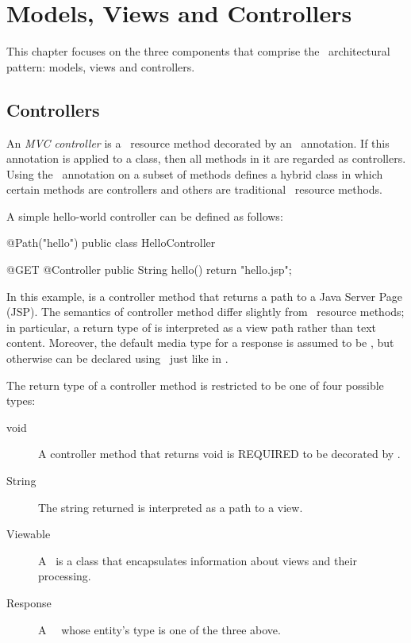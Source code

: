 \chapter{Models, Views and Controllers}
\label{mvc}

This chapter focuses on the three components that comprise the \mvc\ architectural pattern: models, views
and controllers. 

\section{Controllers}
\label{controllers}

An {\em MVC controller} is a \jaxrs\ resource method decorated by an \Controller\ annotation. If 
this annotation is applied to a class, then all methods in it are regarded as controllers. 
Using the \Controller\ annotation on a subset of methods defines a hybrid class in which 
certain methods are controllers and others are traditional \jaxrs\ resource methods.

A simple hello-world controller can be defined as follows:

\begin{listing}{1}
@Path("hello")
public class HelloController {

    @GET
    @Controller
    public String hello() {
        return "hello.jsp";
    }
}
\end{listing}

In this example,  is a controller method that returns a path to a Java Server Page (JSP).
The semantics of controller method differ slightly from \jaxrs\ resource methods; in particular, a
return type of  is interpreted as a view path rather than text content. Moreover,
the default media type for a response is assumed to be , but otherwise can
be declared using \Produces\ just like in \jaxrs.

The return type of a controller method is restricted to be one of four possible types:
\begin{description}
\item[void] A controller method that returns void is REQUIRED to be decorated by \View. 
\item[String] The string returned is interpreted as a path to a view. 
\item[Viewable] A \Viewable\ is a class that encapsulates information about views and their processing.
\item[Response] A \jaxrs\ \Response\ whose entity's type is one of the three above.
\end{description}

